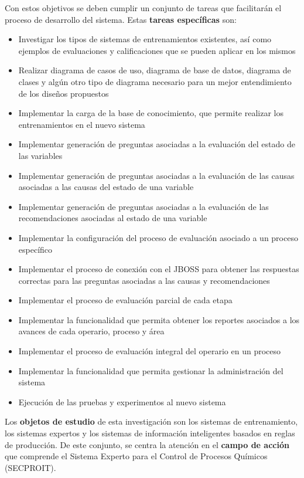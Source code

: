 \documentclass[12pt,a4paper]{report}
\begin{document}
Con estos objetivos se deben cumplir un conjunto de tareas que facilitarán el proceso de desarrollo del sistema. Estas \textbf{tareas específicas} son:
\begin{itemize}
\item Investigar los tipos de sistemas de entrenamientos existentes, así como ejemplos de evaluaciones y calificaciones que se pueden aplicar en los mismos
\item Realizar diagrama de casos de uso, diagrama de base de datos, diagrama de clases y algún otro tipo de diagrama necesario para un mejor entendimiento de los diseños propuestos
\item Implementar la carga de la base de conocimiento, que permite realizar los entrenamientos en el nuevo sistema
\item Implementar generación de preguntas asociadas a la evaluación del estado de las variables
\item Implementar generación de preguntas asociadas a la evaluación de las causas asociadas a las causas del estado de una variable
\item Implementar generación de preguntas asociadas a la evaluación de las recomendaciones asociadas al estado de una variable
\item Implementar la configuración del proceso de evaluación asociado a un proceso específico
\item Implementar el proceso de conexión con el JBOSS para obtener las respuestas correctas para las preguntas asociadas a las causas y recomendaciones
\item Implementar el proceso de evaluación parcial de cada etapa
\item Implementar la funcionalidad que permita obtener los reportes asociados a los avances de cada operario, proceso y área
\item Implementar el proceso de evaluación integral del operario en un proceso
\item Implementar la funcionalidad que permita gestionar la administración del sistema
\item Ejecución de las pruebas y experimentos al nuevo sistema
\end{itemize}

Los \textbf{objetos de estudio} de esta investigación son los sistemas de entrenamiento, los sistemas expertos y los sistemas de información inteligentes basados en reglas de producción.
De este conjunto, se centra la atención en el \textbf{campo de acción} que comprende el Sistema Experto para el Control de Procesos Químicos (SECPROIT).
\end{document}
